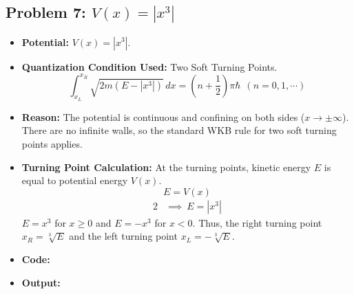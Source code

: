 \documentclass[12pt, a4paper, twoside]{article}
\begin{document}
        \subsection{Problem 7: \texorpdfstring{$V(x) = |x^3|$}{V(x) = |x\^{}3|}}
        \begin{itemize}
            \item {\bf Potential: } $V(x) = |x^3|$.
            \item {\bf Quantization Condition Used: } Two Soft Turning Points. $${\int_{x_L}^{x_R} \sqrt{2m(E - |x^3|)} \, dx} = {\left(n + \frac{1}{2}\right) \pi \hbar} ~~ (n = 0, 1, \cdots)$$
            \item {\bf Reason: }  The potential is continuous and confining on both sides ($x \to \pm \infty$). There are no infinite walls, so the standard WKB rule for two soft turning points applies.
            \item {\bf Turning Point Calculation: } At the turning points, kinetic energy $E$ is equal to potential energy $V(x)$. $$E = V(x)$$ \begin{alignat*}{2}
                &\implies ~ E = |x^3|
            \end{alignat*}
            $E = x^3 $ for $x \geq 0$ and $E = -x^3$ for $x < 0$.
            Thus, the right turning point $ \boxed{x_R = \sqrt[3]{E}}$ and the left turning point $\boxed{x_L = -\sqrt[3]{E}}$.
            \item {\bf Code: } 
            \item {\bf Output: } 
        \end{itemize}
        
\end{document}
